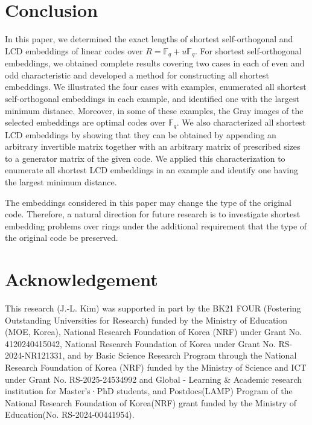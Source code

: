 \documentclass{article}
\theoremstyle{definition}
\theoremstyle{remark}
\begin{document}
\section{Conclusion}
In this paper, we determined the exact lengths of shortest self-orthogonal and LCD embeddings of linear codes over $R=\mathbb{F}_q+u\mathbb{F}_q$. For shortest self-orthogonal embeddings, we obtained complete results covering two cases in each of even and odd characteristic and developed a method for constructing all shortest embeddings. We illustrated the four cases with examples, enumerated all shortest self-orthogonal embeddings in each example, and identified one with the largest minimum distance. Moreover, in some of these examples, the Gray images of the selected embeddings are optimal codes over $\mathbb{F}_q$. We also characterized all shortest LCD embeddings by showing that they can be obtained by appending an arbitrary invertible matrix together with an arbitrary matrix of prescribed sizes to a generator matrix of the given code. We applied this characterization to enumerate all shortest LCD embeddings in an example and identify one having the largest minimum distance.

The embeddings considered in this paper may change the type of the original code. Therefore, a natural direction for future research is to investigate shortest embedding problems over rings under the additional requirement that the type of the original code be preserved.

\section*{Acknowledgement}
This research (J.-L. Kim) was supported in part by the BK21 FOUR (Fostering Outstanding Universities for Research) funded by the Ministry of Education (MOE, Korea), National Research Foundation of Korea (NRF) under Grant No. 4120240415042, National Research Foundation of Korea under Grant No. RS-2024-NR121331, and by Basic Science Research Program through the National Research Foundation of Korea (NRF) funded by the Ministry of Science and ICT under Grant No. RS-2025-24534992 and Global - Learning \& Academic research institution for Master’s·PhD students, and Postdocs(LAMP) Program of the National Research Foundation of Korea(NRF) grant funded by the Ministry of Education(No. RS-2024-00441954).
\end{document}
